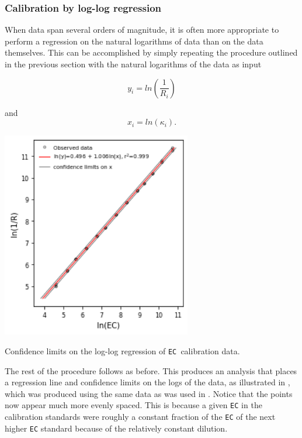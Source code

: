 \subsubsection{Calibration by log-log regression}

When data span several orders of magnitude, it is often more appropriate to perform a regression on the natural logarithms of data than on the data themselves. This can be accomplished by simply repeating the procedure outlined in the previous section with the natural logarithms of the data as input

\begin{equation}
	y_i = ln\left ( \frac{1}{R_i} \right )
\end{equation}

and
\begin{equation}
	x_i = ln(\kappa_i).  
\end{equation}

\begin{marginfigure}[0cm]
	\begin{center}
		\includegraphics[height=9cm]{Images/log_confidence.png}
		\caption[Confidence Limits on Log-Log Regression]{Confidence limits on the log-log regression of \texttt{EC }calibration data.}
	\end{center}
\end{marginfigure}

The rest of the procedure follows as before.  This produces an analysis that places a regression line and confidence limits on the logs of the data, as illustrated in , which was produced using the same data as was used in . Notice that the points now appear much more evenly spaced. This is because a given \texttt{EC} in the calibration standards were roughly a constant fraction of the \texttt{EC} of the next higher \texttt{EC} standard because of the relatively constant dilution.

